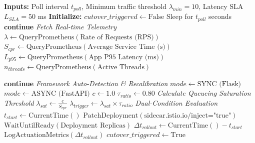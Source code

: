 \documentclass{ieeeaccess}
\begin{document}
	\begin{algorithm}
		\caption{Autonomic Controller with Math-based Predictive \& SLA-Aware Dynamic Cutover}
		\label{alg:ctr}
		\begin{algorithmic}[1]
			\STATE \textbf{Inputs:} Poll interval $t_{poll}$, Minimum traffic threshold $\lambda_{min} = 10$, Latency SLA $L_{SLA} = 50$ ms
			\STATE \textbf{Initialize:} $cutover\_triggered \gets \text{False}$
			\STATE Sleep for $t_{poll}$ seconds
			\STATE \textbf{continue} 
			\ENDIF
			\vspace{2mm}
			\STATE \textit{Fetch Real-time Telemetry}
			\STATE $\lambda \gets \text{QueryPrometheus}(\text{Rate of Requests (RPS)})$
			\STATE $S_{cpr} \gets \text{QueryPrometheus}(\text{Average Service Time (s)})$
			\STATE $L_{p95} \gets \text{QueryPrometheus}(\text{App P95 Latency (ms)})$
			\STATE $n_{threads} \gets \text{QueryPrometheus}(\text{Active Threads})$
			
			\STATE \textbf{continue} 
			\ENDIF
			\vspace{2mm}
			\STATE \textit{Framework Auto-Detection \& Recalibration}
			\STATE $mode \gets \text{SYNC (Flask)}$
			\ELSE
			\STATE $mode \gets \text{ASYNC (FastAPI)}$
			\ENDIF
			\STATE $c \gets 1.0$ 
			\STATE $\tau_{ratio} \gets 0.80$ 
			\vspace{2mm}
			\STATE \textit{Calculate Queueing Saturation Threshold}
			\STATE $\lambda_{sat} \gets \frac{c}{S_{cpr}}$
			\STATE $\lambda_{trigger} \gets \lambda_{sat} \times \tau_{ratio}$
			\vspace{2mm}
			\STATE \textit{Dual-Condition Evaluation}
			\STATE $t_{start} \gets \text{CurrentTime}()$
			\STATE $\text{PatchDeployment}(\text{sidecar.istio.io/inject="true"})$
			\STATE $\text{WaitUntilReady}(\text{Deployment Replicas})$
			\STATE $\Delta t_{rollout} \gets \text{CurrentTime}() - t_{start}$
			\STATE $\text{LogActuationMetrics}(\Delta t_{rollout})$
			\STATE $cutover\_triggered \gets \text{True}$
			\ENDIF
			\ENDWHILE
		\end{algorithmic}
	\end{algorithm}
	
\end{document}
